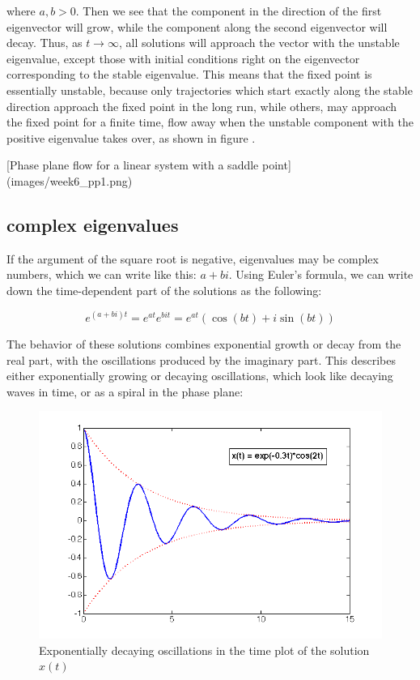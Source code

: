 \documentclass[
  letterpaper,
  DIV=11,
  numbers=noendperiod]{scrreprt}
\begin{document}
where \(a,b>0\). Then we see that the component in the direction of the
first eigenvector will grow, while the component along the second
eigenvector will decay. Thus, as \(t \rightarrow \infty\), all solutions
will approach the vector with the unstable eigenvalue, except those with
initial conditions right on the eigenvector corresponding to the stable
eigenvalue. This means that the fixed point is essentially unstable,
because only trajectories which start exactly along the stable direction
approach the fixed point in the long run, while others, may approach the
fixed point for a finite time, flow away when the unstable component
with the positive eigenvalue takes over, as shown in figure .

{[}Phase plane flow for a linear system with a saddle point{]}
(images/week6\_pp1.png)

\hypertarget{complex-eigenvalues}{%
\subsection{complex eigenvalues}\label{complex-eigenvalues}}

If the argument of the square root is negative, eigenvalues may be
complex numbers, which we can write like this: \(a+bi\). Using Euler's
formula, we can write down the time-dependent part of the solutions as
the following:

\[
e^{(a + bi)t} = e^{at}e^{bit}= e^{at}(\cos(bt)+i\sin(bt))
\]

The behavior of these solutions combines exponential growth or decay
from the real part, with the oscillations produced by the imaginary
part. This describes either exponentially growing or decaying
oscillations, which look like decaying waves in time, or as a spiral in
the phase plane:

\begin{figure}

{\centering \includegraphics{./images/lec7_exp_osc.png}

}

\caption{Exponentially decaying oscillations in the time plot of the
solution \(x(t)\)}

\end{figure}
\end{document}
